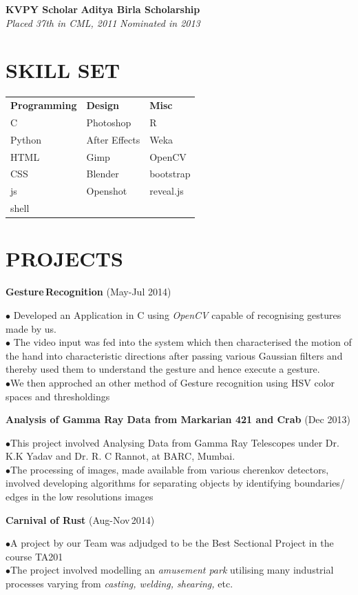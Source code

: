 \documentclass{article}
\newcommand{\sepspace}{\vspace*{0.8em}}
\newcommand{\NewPart}[1]{\section*{\uppercase{#1}}}
\newcommand{\SkillsEntry}[3]{#1 & #2 & #3\\}
\newcommand{\ScholasticAcheivements}[4]{
		\noindent \textbf{#1} \hfill \textbf{#2} \\
		\textit{#3}	 \hfill	 \textit{ #4} 	
		\normalsize \par
		}
\newcommand{\WorkEntry}[3]{						
		\noindent \textbf{#1} \hfill 					
		(#2) \par		
		\noindent #3 \par					
		}
\begin{document}
\ScholasticAcheivements{KVPY Scholar}{Aditya Birla Scholarship}{Placed 37th in CML, 2011}{Nominated in 2013}
\NewPart{Skill Set}
	\begin{tabular}{m{}  m{} m{}}
		\SkillsEntry{\textbf{Programming}}{\textbf{Design}}{\textbf{Misc}}
		\SkillsEntry{C}{Photoshop}{R}
		\SkillsEntry{Python}{After Effects}{Weka}
		\SkillsEntry{HTML}{Gimp}{OpenCV}
		\SkillsEntry{CSS}{Blender}{bootstrap}
		\SkillsEntry{js}{Openshot}{reveal.js}
		\SkillsEntry{shell}{}{}
	\end{tabular}
\NewPart{Projects}

\WorkEntry{Gesture\,Recognition}{May-Jul 2014}{$\bullet$ Developed an Application in C using \emph{OpenCV} capable of recognising gestures made by us.\\ $\bullet$ The video input was fed into the system which then characterised the motion of the hand into characteristic
directions after passing various Gaussian filters and thereby used them to understand the gesture and
hence execute a gesture.\\$\bullet$We then approched an other method of Gesture recognition using HSV color spaces and thresholdings}
\sepspace

\WorkEntry{Analysis of Gamma Ray Data from Markarian 421 and Crab}{Dec 2013}{$\bullet$This project involved Analysing Data from Gamma Ray Telescopes under Dr. K.K Yadav and Dr. R. C Rannot,
at BARC, Mumbai.\\$\bullet$The processing of images, made available from various cherenkov detectors, involved developing algorithms
for separating objects by identifying boundaries/ edges in the low resolutions images}
\sepspace
\WorkEntry{Carnival of Rust}{Aug-Nov\,2014}{$\bullet$A project by our Team was adjudged to be the Best Sectional Project in the course TA201\\$\bullet$The project involved modelling an \emph{amusement park} utilising many industrial processes varying from \emph{casting, welding, shearing,} etc.}

\end{document}
